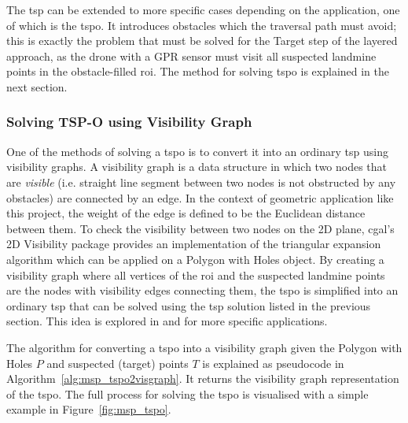 
The \gls{tsp} can be extended to more specific cases depending on the application, one of which is the \gls{tspo}. It introduces obstacles which the traversal path must avoid; this is exactly the problem that must be solved for the Target step of the layered approach, as the drone with a \gls{GPR} sensor must visit all suspected landmine points in the obstacle-filled \gls{roi}. The method for solving \gls{tspo} is explained in the next section. 

\subsubsection{Solving TSP-O using Visibility Graph}

One of the methods of solving a \gls{tspo} is to convert it into an ordinary \gls{tsp} using visibility graphs. A visibility graph is a data structure in which two nodes that are \textit{visible} (i.e. straight line segment between two nodes is not obstructed by any obstacles) are connected by an edge. In the context of geometric application like this project, the weight of the edge is defined to be the Euclidean distance between them. To check the visibility between two nodes on the 2D plane, \gls{cgal}'s 2D Visibility package \cite{cgal2024visibility} provides an implementation of the triangular expansion algorithm which can be applied on a Polygon with Holes object. By creating a visibility graph where all vertices of the \gls{roi} and the suspected landmine points are the nodes with visibility edges connecting them, the \gls{tspo} is simplified into an ordinary \gls{tsp} that can be solved using the \gls{tsp} solution listed in the previous section. This idea is explored in \cite{barb2024tspo} and \cite{bhat2024tspo} for more specific applications. 

The algorithm for converting a \gls{tspo} into a visibility graph given the Polygon with Holes $P$ and suspected (target) points $T$ is explained as pseudocode in Algorithm~\ref{alg:msp_tspo2visgraph}. It returns the visibility graph representation of the \gls{tspo}. The full process for solving the \gls{tspo} is visualised with a simple example in Figure~\ref{fig:msp_tspo}.

